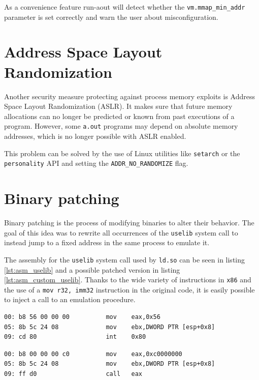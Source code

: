 \documentclass[draft,final]{vutinfth} %
\begin{document}
As a convenience feature run-aout will detect whether the \texttt{vm.mmap\_min\_addr} parameter is set correctly and warn the user about misconfiguration.

\section{Address Space Layout Randomization}
\label{explore_aslr}

Another security measure protecting against process memory exploits is Address Space Layout Randomization (ASLR). It makes sure that future memory allocations can no longer be predicted or known from past executions of a program. However, some \texttt{a.out} programs may depend on absolute memory addresses, which is no longer possible with ASLR enabled.

This problem can be solved by the use of Linux utilities like \texttt{setarch} or the \texttt{personality} API and setting the \texttt{ADDR\_NO\_RANDOMIZE} flag.

\section{Binary patching}
\label{explore_binpatch}

Binary patching is the process of modifying binaries to alter their behavior. The goal of this idea was to rewrite all occurrences of the \texttt{uselib} system call to instead jump to a fixed address in the same process to emulate it.

The assembly for the \texttt{uselib} system call used by \texttt{ld.so} can be seen in listing \ref{lst:asm_uselib} and a possible patched version in listing \ref{lst:asm_custom_uselib}. Thanks to the wide variety of instructions in \texttt{x86} and the use of a \texttt{mov r32, imm32} instruction in the original code, it is easily possible to inject a call to an emulation procedure.

\begin{lstlisting}[caption={Assembly for the invocation of the \texttt{uselib} system call as used by \texttt{ld.so}}, label={lst:asm_uselib}]
00:	b8 56 00 00 00       	mov    eax,0x56
05:	8b 5c 24 08          	mov    ebx,DWORD PTR [esp+0x8]
09:	cd 80                	int    0x80
\end{lstlisting}

\begin{lstlisting}[caption={A possible patch replacing the system call with a call to our custom handler located at (for example) \texttt{0xc000\_0000}}, label={lst:asm_custom_uselib}]
00:	b8 00 00 00 c0       	mov    eax,0xc0000000
05:	8b 5c 24 08          	mov    ebx,DWORD PTR [esp+0x8]
09:	ff d0                	call   eax
\end{lstlisting}
\end{document}
